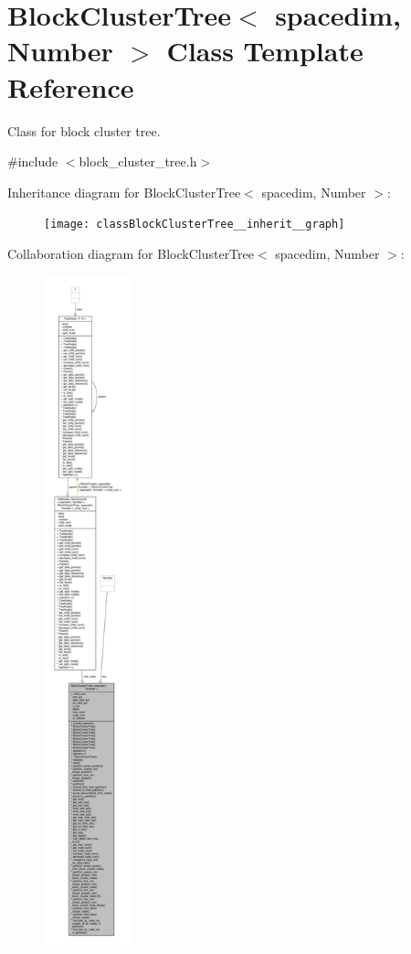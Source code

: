 \hypertarget{classBlockClusterTree}{}\section{Block\+Cluster\+Tree$<$ spacedim, Number $>$ Class Template Reference}
\label{classBlockClusterTree}


Class for block cluster tree.  




{\ttfamily \#include $<$block\+\_\+cluster\+\_\+tree.\+h$>$}



Inheritance diagram for Block\+Cluster\+Tree$<$ spacedim, Number $>$\+:\nopagebreak
\begin{figure}[H]
\begin{center}
\leavevmode
\texttt{[image: classBlockClusterTree\_\_inherit\_\_graph]}
\end{center}
\end{figure}


Collaboration diagram for Block\+Cluster\+Tree$<$ spacedim, Number $>$\+:\nopagebreak
\begin{figure}[H]
\begin{center}
\leavevmode
\includegraphics[height=550pt]{classBlockClusterTree__coll__graph}
\end{center}
\end{figure}
